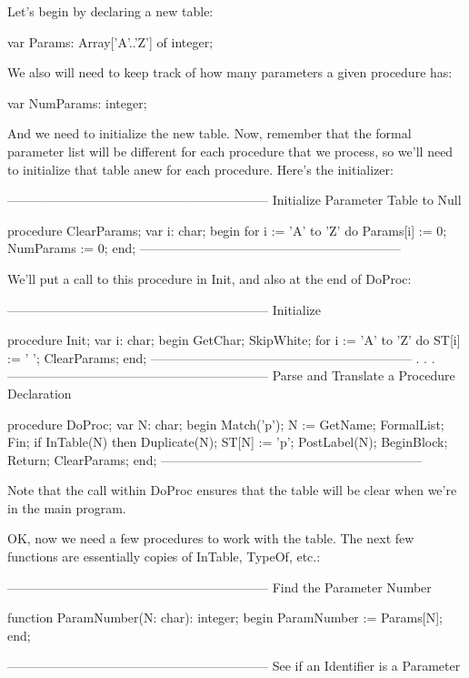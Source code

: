 \documentclass[float=false, crop=false]{standalone}
\begin{document}
Let's begin by declaring a new table:


     var Params: Array['A'..'Z'] of integer;


We also will need to keep track of how many parameters a given procedure has:


     var NumParams: integer;


And we need to initialize the new table. Now, remember that the formal parameter
list will be different for each procedure that we process, so we'll need to
initialize that table anew for each procedure. Here's the initializer:


{--------------------------------------------------------------} { Initialize
Parameter Table to Null }

procedure ClearParams;
var i: char;
begin
     for i := 'A' to 'Z' do
          Params[i] := 0;
     NumParams := 0;
end;
{--------------------------------------------------------------}


We'll put a call to this procedure in Init, and  also  at the end
of DoProc:


{--------------------------------------------------------------}
{ Initialize }

procedure Init;
var i: char;
begin
     GetChar;
     SkipWhite;
     for i := 'A' to 'Z' do
          ST[i] := ' ';
     ClearParams;
end;
{--------------------------------------------------------------}
.
.
.
{--------------------------------------------------------------}
{ Parse and Translate a Procedure Declaration }

procedure DoProc;
var N: char;
begin
     Match('p');
     N := GetName;
     FormalList;
     Fin;
     if InTable(N) then Duplicate(N);
     ST[N] := 'p';
     PostLabel(N);
     BeginBlock;
     Return;
     ClearParams;
end;
{--------------------------------------------------------------}


Note that the call within DoProc ensures that the table will be clear when we're
in the main program.


OK, now we need a few procedures to work with the table. The next few functions
are essentially copies of InTable, TypeOf, etc.:


{--------------------------------------------------------------}
{ Find the Parameter Number }

function ParamNumber(N: char): integer;
begin
     ParamNumber := Params[N];
end;


{--------------------------------------------------------------}
{ See if an Identifier is a Parameter }
\end{document}
